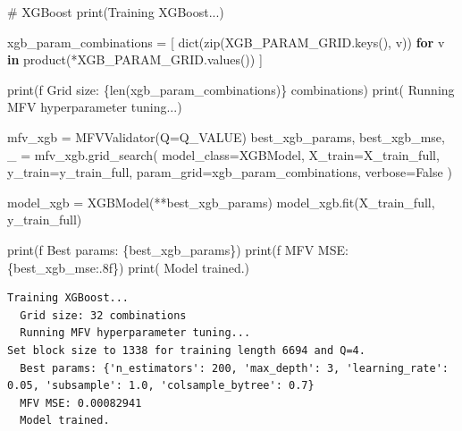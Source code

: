 \documentclass[
  letterpaper,
  DIV=11,
  numbers=noendperiod]{scrartcl}
\newenvironment{Shaded}{\begin{snugshade}}{\end{snugshade}}
\newcommand{\BuiltInTok}[1]{\textcolor[rgb]{0.00,0.23,0.31}{#1}}
\newcommand{\CommentTok}[1]{\textcolor[rgb]{0.37,0.37,0.37}{#1}}
\newcommand{\ControlFlowTok}[1]{\textcolor[rgb]{0.00,0.23,0.31}{\textbf{#1}}}
\newcommand{\KeywordTok}[1]{\textcolor[rgb]{0.00,0.23,0.31}{\textbf{#1}}}
\newcommand{\NormalTok}[1]{\textcolor[rgb]{0.00,0.23,0.31}{#1}}
\newcommand{\OperatorTok}[1]{\textcolor[rgb]{0.37,0.37,0.37}{#1}}
\newcommand{\SpecialCharTok}[1]{\textcolor[rgb]{0.37,0.37,0.37}{#1}}
\newcommand{\SpecialStringTok}[1]{\textcolor[rgb]{0.13,0.47,0.30}{#1}}
\newcommand{\StringTok}[1]{\textcolor[rgb]{0.13,0.47,0.30}{#1}}
\newcommand{\VariableTok}[1]{\textcolor[rgb]{0.07,0.07,0.07}{#1}}
\begin{document}
\begin{Shaded}
\begin{Highlighting}[]
\CommentTok{\# XGBoost}
\BuiltInTok{print}\NormalTok{(}\StringTok{\textquotesingle{}Training XGBoost...\textquotesingle{}}\NormalTok{)}

\NormalTok{xgb\_param\_combinations }\OperatorTok{=}\NormalTok{ [}
    \BuiltInTok{dict}\NormalTok{(}\BuiltInTok{zip}\NormalTok{(XGB\_PARAM\_GRID.keys(), v))}
    \ControlFlowTok{for}\NormalTok{ v }\KeywordTok{in}\NormalTok{ product(}\OperatorTok{*}\NormalTok{XGB\_PARAM\_GRID.values())}
\NormalTok{]}

\BuiltInTok{print}\NormalTok{(}\SpecialStringTok{f\textquotesingle{}  Grid size: }\SpecialCharTok{\{}\BuiltInTok{len}\NormalTok{(xgb\_param\_combinations)}\SpecialCharTok{\}}\SpecialStringTok{ combinations\textquotesingle{}}\NormalTok{)}
\BuiltInTok{print}\NormalTok{(}\StringTok{\textquotesingle{}  Running MFV hyperparameter tuning...\textquotesingle{}}\NormalTok{)}

\NormalTok{mfv\_xgb }\OperatorTok{=}\NormalTok{ MFVValidator(Q}\OperatorTok{=}\NormalTok{Q\_VALUE)}
\NormalTok{best\_xgb\_params, best\_xgb\_mse, \_ }\OperatorTok{=}\NormalTok{ mfv\_xgb.grid\_search(}
\NormalTok{    model\_class}\OperatorTok{=}\NormalTok{XGBModel,}
\NormalTok{    X\_train}\OperatorTok{=}\NormalTok{X\_train\_full, y\_train}\OperatorTok{=}\NormalTok{y\_train\_full,}
\NormalTok{    param\_grid}\OperatorTok{=}\NormalTok{xgb\_param\_combinations, verbose}\OperatorTok{=}\VariableTok{False}
\NormalTok{)}

\NormalTok{model\_xgb }\OperatorTok{=}\NormalTok{ XGBModel(}\OperatorTok{**}\NormalTok{best\_xgb\_params)}
\NormalTok{model\_xgb.fit(X\_train\_full, y\_train\_full)}

\BuiltInTok{print}\NormalTok{(}\SpecialStringTok{f\textquotesingle{}  Best params: }\SpecialCharTok{\{}\NormalTok{best\_xgb\_params}\SpecialCharTok{\}}\SpecialStringTok{\textquotesingle{}}\NormalTok{)}
\BuiltInTok{print}\NormalTok{(}\SpecialStringTok{f\textquotesingle{}  MFV MSE: }\SpecialCharTok{\{}\NormalTok{best\_xgb\_mse}\SpecialCharTok{:.8f\}}\SpecialStringTok{\textquotesingle{}}\NormalTok{)}
\BuiltInTok{print}\NormalTok{(}\StringTok{\textquotesingle{}  Model trained.\textquotesingle{}}\NormalTok{)}
\end{Highlighting}
\end{Shaded}

\begin{verbatim}
Training XGBoost...
  Grid size: 32 combinations
  Running MFV hyperparameter tuning...
Set block size to 1338 for training length 6694 and Q=4.
  Best params: {'n_estimators': 200, 'max_depth': 3, 'learning_rate': 0.05, 'subsample': 1.0, 'colsample_bytree': 0.7}
  MFV MSE: 0.00082941
  Model trained.
\end{verbatim}
\end{document}
